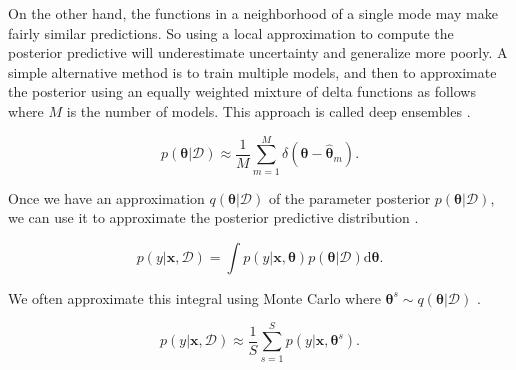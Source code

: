 \documentclass[../../../main.tex]{subfiles}
\begin{document}
On the other hand, the functions in a neighborhood of a single mode may make fairly similar predictions. So using a local approximation to compute the posterior predictive will underestimate uncertainty and generalize more poorly. A simple alternative method is to train multiple models, and then to approximate the posterior using an equally weighted mixture of delta functions as follows where $M$ is the number of models. This approach is called deep ensembles \autocite{Murphy2023}.

\begin{equation}
p(\bm{\theta}|\mathcal{D}) \approx \frac{1}{M}\sum_{m=1}^{M} \delta(\bm{\theta}-\hat{\bm{\theta}}_m).
\end{equation}

Once we have an approximation $q(\bm{\theta}|\mathcal{D})$ of the parameter posterior $p(\bm{\theta}|\mathcal{D})$, we can use it to approximate the posterior predictive distribution \autocite{Murphy2023}.

\begin{equation}
p(y|\bm{x},\mathcal{D})=\int p(y|\bm{x},\bm{\theta})p(\bm{\theta}|\mathcal{D})\mathrm{d}\bm{\theta}.
\end{equation}

We often approximate this integral using Monte Carlo where $\bm{\theta}^s \sim q(\bm{\theta}|\mathcal{D})$ \autocite{Murphy2023}.

\begin{equation}
p(y|\bm{x},\mathcal{D}) \approx \frac{1}{S}\sum_{s=1}^{S}p(y|\bm{x},\bm{\theta}^s).
\end{equation}
\end{document}
